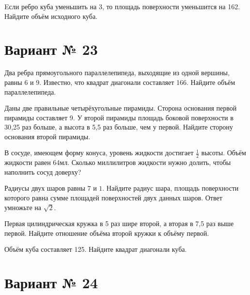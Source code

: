 \documentclass[4apaper]{article}
\begin{document}
\begin{taskBN}{6}
Eсли ребро куба уменьшить на 3, то площадь поверхности уменьшится на 162. Найдите объём исходного куба.
\end{taskBN}
\newpage\section*{Вариант № 23}

\begin{taskBN}{1}
Два ребра прямоугольного параллелепипеда, выходящие из одной вершины, равны 6 и 9. Известно, что квадрат диагонали составляет 166. Найдите объём параллелепипеда.
\end{taskBN}

\begin{taskBN}{2}
Даны две правильные четырёхугольные пирамиды. Сторона основания первой пирамиды составляет 9. У второй пирамиды площадь боковой поверхности в 30,25 раз больше, а высота в 5,5 раз больше, чем у первой. Найдите сторону основания второй пирамиды.
\end{taskBN}

\begin{taskBN}{3}
В сосуде, имеющем форму конуса, уровень жидкости достигает $\frac{1}{2}$ высоты. Объём жидкости равен 64мл. Сколько миллилитров жидкости нужно долить, чтобы наполнить сосуд доверху?
\end{taskBN}

\begin{taskBN}{4}
Радиусы двух шаров равны $7$ и $1$. Найдите радиус шара, площадь поверхности которого равна сумме площадей поверхностей двух данных шаров. Ответ умножьте на $\sqrt{2}$.
\end{taskBN}

\begin{taskBN}{5}
 Первая цилиндрическая кружка в 5 раз шире второй, а вторая в 7,5 раз выше первой. Найдите отношение объёма второй кружки к объёму первой.
\end{taskBN}

\begin{taskBN}{6}
Объём куба составляет 125. Найдите квадрат диагонали куба.
\end{taskBN}
\newpage\section*{Вариант № 24}
\end{document}
